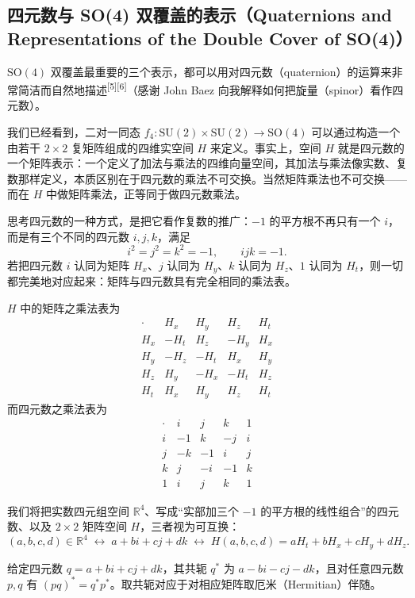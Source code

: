 \subsection{四元数与 SO(4) 双覆盖的表示（Quaternions and Representations of the Double Cover of SO(4)）}

$\mathrm{SO}(4)$ 双覆盖最重要的三个表示，都可以用对四元数（quaternion）的运算来非常简洁而自然地描述\textsuperscript{[5][6]}（感谢 John Baez 向我解释如何把旋量（spinor）看作四元数）。

我们已经看到，二对一同态 $f_4:\mathrm{SU}(2)\times\mathrm{SU}(2)\to \mathrm{SO}(4)$ 可以通过构造一个由若干 $2\times2$ 复矩阵组成的四维实空间 $H$ 来定义。事实上，空间 $H$ 就是四元数的一个矩阵表示：一个定义了加法与乘法的四维向量空间，其加法与乘法像实数、复数那样定义，本质区别在于四元数的乘法不可交换。当然矩阵乘法也不可交换——而在 $H$ 中做矩阵乘法，正等同于做四元数乘法。

思考四元数的一种方式，是把它看作复数的推广：$-1$ 的平方根不再只有一个 $i$，而是有三个不同的四元数 $i,j,k$，满足
\[
i^2=j^2=k^2=-1,\qquad ijk=-1 .
\]
若把四元数 $i$ 认同为矩阵 $H_x$、$j$ 认同为 $H_y$、$k$ 认同为 $H_z$、$1$ 认同为 $H_t$，则一切都完美地对应起来：矩阵与四元数具有完全相同的乘法表。

$H$ 中的矩阵之乘法表为
\[
\begin{array}{c|cccc}
\cdot & H_x & H_y & H_z & H_t \\ \hline
H_x & -H_t & H_z & -H_y & H_x\\
H_y & -H_z & -H_t & H_x & H_y\\
H_z & H_y & -H_x & -H_t & H_z\\
H_t & H_x & H_y & H_z & H_t
\end{array}
\]
而四元数之乘法表为
\[
\begin{array}{c|cccc}
\cdot & i & j & k & 1 \\ \hline
i & -1 & k & -j & i\\
j & -k & -1 & i & j\\
k & j & -i & -1 & k\\
1 & i & j & k & 1
\end{array}
\]

我们将把实数四元组空间 $\mathbb{R}^4$、写成“实部加三个 $-1$ 的平方根的线性组合”的四元数、以及 $2\times2$ 矩阵空间 $H$，三者视为可互换：
\[
(a,b,c,d)\in\mathbb{R}^4 \;\longleftrightarrow\; a+bi+cj+dk
\;\longleftrightarrow\; H(a,b,c,d)=a H_t+b H_x+c H_y+d H_z .
\]

给定四元数 $q=a+bi+cj+dk$，其共轭 $q^*$ 为 $a-bi-cj-dk$，且对任意四元数 $p,q$ 有 $(pq)^*=q^*p^*$。取共轭对应于对相应矩阵取厄米（Hermitian）伴随。

